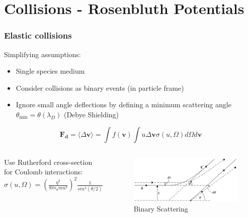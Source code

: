 \documentclass[10pt]{beamer}
\begin{document}
\section{Collisions - Rosenbluth Potentials}

 \begin{frame}
     \frametitle{Elastic collisions}
     Simplifying assumptions:
     \begin{itemize}
	 \setlength{\itemsep}{3mm}
         \item Single species medium
         \item Consider collisions as binary events (in particle frame)
         \item Ignore small angle deflections by defining a minimum scattering angle $\theta_{\text{min}} = \theta(\lambda_D)$ (Debye Shielding)
     \end{itemize}

     \begin{equation}
         \bm{F_d} = \langle \Delta\mathbf{v} \rangle = \int f(\bm v) \int u \Delta \bm v \sigma(u, \Omega) d\Omega d\bm v 
     \end{equation}

	 \begin{columns}
		 	Use Rutherford cross-section for Coulomb interactions: 
			\newline \newline
				$\sigma(u, \Omega) = \left(\frac{q^2}{8 \pi \epsilon_0 m u^2} \right)^2 \frac{1}{sin^4(\theta/2)}$
		 \begin{figure}
			 \includegraphics[scale=0.1]{figures/scattering.png}
			 \caption{Binary Scattering \cite{boyd_sanderson_2003}}
			 \label{fig:scattering}
		 \end{figure}
	 \end{columns}


 \end{frame}
\end{document}
